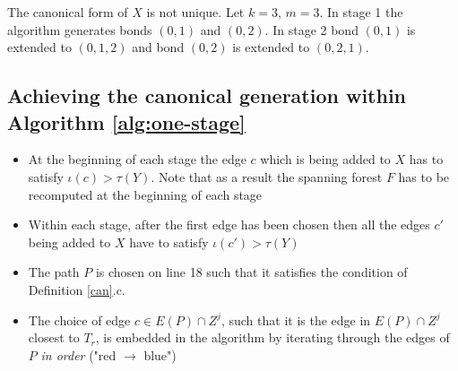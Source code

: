 \begin{exmp*}
	The canonical form of $X$ is not unique.
	Let $k = 3$, $m = 3$. In stage 1 the algorithm generates bonds $(0,1)$ and $(0,2)$. In stage 2 bond $(0,1)$ is extended to $(0,1,2)$ and bond $(0,2)$ is extended to $(0,2,1)$.

	\begin{center}
		
	\end{center}

\vspace{-0.5cm}
\end{exmp*}

\subsection*{Achieving the canonical generation within Algorithm \ref{alg:one-stage}}

\begin{itemize}
	\item At the beginning of each stage the edge $c$ which is being added to $X$ has to satisfy $\iota(c) > \tau(Y)$. Note that as a result the spanning forest $F$ has to be recomputed at the beginning of each stage

	\item Within each stage, after the first edge has been chosen then all the edges $c'$ being added to $X$ have to satisfy $\iota(c') > \tau(Y)$

	\item The path $P$ is chosen on line 18 such that it satisfies the condition of Definition \ref{can}.c.

	\item The choice of edge $c \in E(P) \cap Z^j$, such that it is the edge in $E(P) \cap Z^j$ closest to $T_r$, is embedded in the algorithm by iterating through the edges of $P$ \textit{in order} ("red $\rightarrow$ blue")

\end{itemize}

\clearpage

